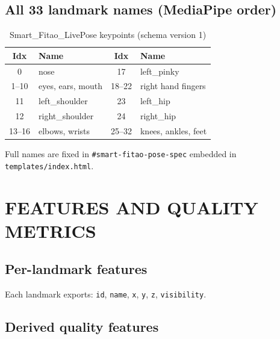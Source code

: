 \documentclass[a4paper,fleqn]{cas-sc}
\newcommand{\tblheadrow}{\rowcolor{tblhead}}
\begin{document}
\subsection{All 33 landmark names (MediaPipe order)}

\begin{table}[h]
\centering
\caption{Smart\_Fitao\_LivePose keypoints (schema version 1)}
\label{tab:landmarks}
\small
\begin{tabular}{@{}clcl@{}}
\tblheadrow
\textbf{Idx} & \textbf{Name} & \textbf{Idx} & \textbf{Name} \\
\midrule
0 & nose & 17 & left\_pinky \\
1--10 & eyes, ears, mouth & 18--22 & right hand fingers \\
11 & left\_shoulder & 23 & left\_hip \\
12 & right\_shoulder & 24 & right\_hip \\
13--16 & elbows, wrists & 25--32 & knees, ankles, feet \\
\end{tabular}
\end{table}

Full names are fixed in \texttt{\#smart-fitao-pose-spec} embedded in \texttt{templates/index.html}.

\section{FEATURES AND QUALITY METRICS}

\subsection{Per-landmark features}

Each landmark exports: \texttt{id}, \texttt{name}, \texttt{x}, \texttt{y}, \texttt{z}, \texttt{visibility}.

\subsection{Derived quality features}
\end{document}
